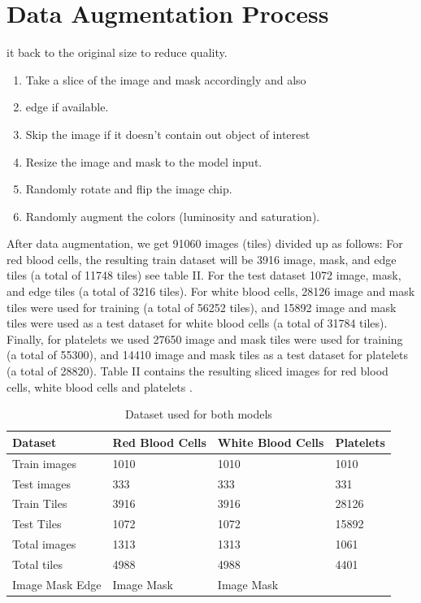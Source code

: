 \documentclass[conference]{IEEEtran}
\begin{document}
\section{Data Augmentation Process}
it back to the original size to reduce quality.
\begin{enumerate}
\item Take a slice of the image and mask accordingly and also
\item edge if available.
\item Skip the image if it doesn’t contain out object of interest
\item Resize the image and mask to the model input.
\item Randomly rotate and flip the image chip.
\item Randomly augment the colors (luminosity and saturation).
\end{enumerate}
After data augmentation, we get 91060 images (tiles) divided up as follows: For red blood cells, the resulting train dataset will be 3916 image, mask, and edge tiles (a total of 11748 tiles) see table II. For the test dataset 1072 image, mask, and edge tiles (a total of 3216 tiles). For white blood cells, 28126 image and mask tiles were used for training (a total of 56252 tiles), and 15892 image and mask tiles were used as a test dataset for white blood cells (a total of 31784 tiles). Finally, for platelets we used 27650 image and mask tiles were used for training (a total of 55300), and 14410 image and mask tiles as a test dataset for platelets (a total of 28820). Table II contains the resulting sliced images for red blood cells, white blood cells and platelets .
\begin{table}[htbp]
\centering
\caption{Dataset used for both models}
\label{tab:II}
\begin{tabular}{llll}
\hline
Dataset & Red Blood Cells & White Blood Cells & Platelets \\
\hline
Train images & 1010 & 1010 & 1010 \\
Test images & 333 & 333 & 331 \\
Train Tiles & 3916 & 3916 & 28126 \\
Test Tiles & 1072 & 1072 & 15892 \\
Total images & 1313 & 1313 & 1061 \\
Total tiles & 4988 & 4988 & 4401 \\
Image Mask Edge & Image Mask & Image Mask \\
\hline
\end{tabular}
\end{table}
\end{document}
